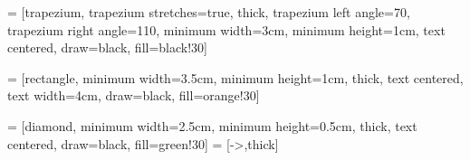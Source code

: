  = [trapezium,
trapezium stretches=true, %
thick,
trapezium left angle=70,
trapezium right angle=110,
minimum width=3cm,
minimum height=1cm, text centered,
draw=black, fill=black!30]

 = [rectangle,
minimum width=3.5cm,
minimum height=1cm,
thick,
text centered,
text width=4cm,
draw=black,
fill=orange!30]

 = [diamond,
minimum width=2.5cm,
minimum height=0.5cm,
thick,
text centered,
draw=black,
fill=green!30]
 = [->,thick]


\usepackage{sankey}

\newcommand\source[1]{%
    \tikz[remember picture,baseline,inner sep=0pt] {%
        \node [name=source,anchor=base]{$#1$};
    }%
    \setcounter{target}{0}
}

\newcommand\target[1]{%
    \tikz[remember picture,baseline,inner sep=0pt] {%
        \node [name=target-\thetarget,anchor=base]{$#1$};
    }%
    \stepcounter{target}%
}

\newcommand\drawarrows{
    \tikz[remember picture, overlay, bend left=20, -latex] {
        \foreach \i [evaluate=\i as \n using int(\i-1)] in {1,...,\thetarget} {
            \draw (source.north) to (target-\n.north);
        }
    }
}